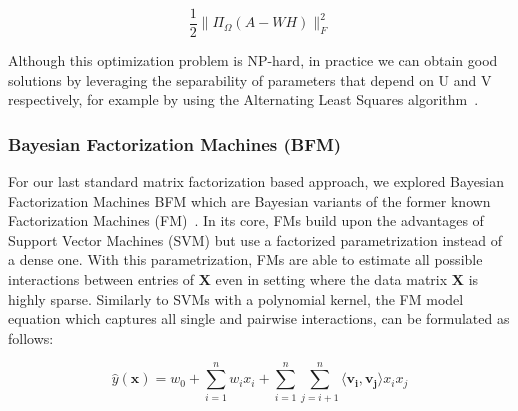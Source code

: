 \documentclass[10pt,conference,compsocconf]{IEEEtran}
\begin{document}
    $$ \frac{1}{2}\|\Pi_{\Omega}(A - WH)\|^2_F$$

    Although this optimization problem is NP-hard, in practice we can obtain good solutions by leveraging the separability of parameters that depend on U and V respectively, for example by using the Alternating Least Squares algorithm~\cite{als}.

    \subsubsection{Bayesian Factorization Machines (BFM)}
    For our last standard matrix factorization based approach, we explored Bayesian Factorization Machines BFM which are Bayesian variants of the former known Factorization Machines (FM)~\cite{rendle_factorization_2010}.
    In its core, FMs build upon the advantages of Support Vector Machines (SVM) but use a factorized parametrization instead of a dense one.
    With this parametrization, FMs are able to estimate all possible interactions between entries of $\mathbf{X}$ even in setting where the data matrix $\mathbf{X}$ is highly sparse.
    Similarly to SVMs with a polynomial kernel, the FM model equation which captures all single and pairwise interactions, can be formulated as follows:

    $$\hat{y}(\mathbf{x})=w_0+\sum^n_{i=1}w_ix_i + \sum^n_{i=1}\sum^n_{j=i+1}\langle \mathbf{v_i},\mathbf{v_j} \rangle x_ix_j$$
\end{document}
